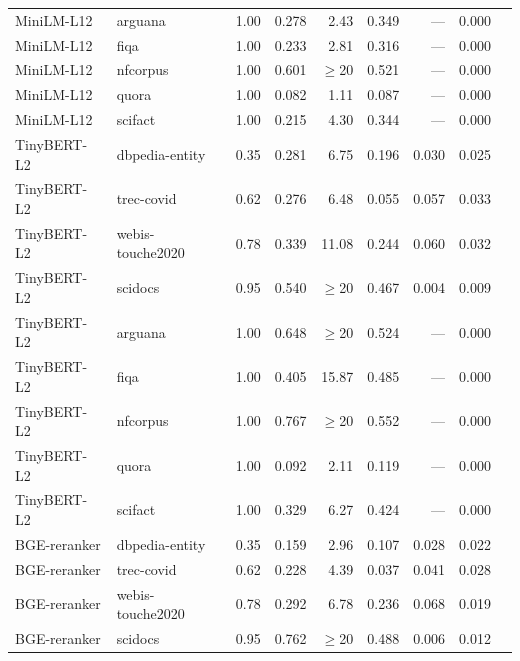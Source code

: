 \begin{table}[h!]
\begin{tabular}{llrrrrrrr}
MiniLM-L12     & arguana              & 1.00 & 0.278 & 2.43 & 0.349 & --- & 0.000 \\
\rowcolor{singleclasspink}
MiniLM-L12     & fiqa                 & 1.00 & 0.233 & 2.81 & 0.316 & --- & 0.000 \\
\rowcolor{singleclasspink}
MiniLM-L12     & nfcorpus             & 1.00 & 0.601 & $\geq$20 & 0.521 & --- & 0.000 \\
\rowcolor{singleclasspink}
MiniLM-L12     & quora                & 1.00 & 0.082 & 1.11 & 0.087 & --- & 0.000 \\
\rowcolor{singleclasspink}
MiniLM-L12     & scifact              & 1.00 & 0.215 & 4.30 & 0.344 & --- & 0.000 \\
\midrule
\rowcolor{cleangreen}
TinyBERT-L2    & dbpedia-entity       & 0.35 & 0.281 & 6.75 & 0.196 & 0.030 & 0.025 \\
\rowcolor{cleangreen}
TinyBERT-L2    & trec-covid           & 0.62 & 0.276 & 6.48 & 0.055 & 0.057 & 0.033 \\
\rowcolor{cleangreen}
TinyBERT-L2    & webis-touche2020     & 0.78 & 0.339 & 11.08 & 0.244 & 0.060 & 0.032 \\
\rowcolor{cleangreen}
TinyBERT-L2    & scidocs              & 0.95 & 0.540 & $\geq$20 & 0.467 & 0.004 & 0.009 \\
\rowcolor{singleclasspink}
TinyBERT-L2    & arguana              & 1.00 & 0.648 & $\geq$20 & 0.524 & --- & 0.000 \\
\rowcolor{singleclasspink}
TinyBERT-L2    & fiqa                 & 1.00 & 0.405 & 15.87 & 0.485 & --- & 0.000 \\
\rowcolor{singleclasspink}
TinyBERT-L2    & nfcorpus             & 1.00 & 0.767 & $\geq$20 & 0.552 & --- & 0.000 \\
\rowcolor{singleclasspink}
TinyBERT-L2    & quora                & 1.00 & 0.092 & 2.11 & 0.119 & --- & 0.000 \\
\rowcolor{singleclasspink}
TinyBERT-L2    & scifact              & 1.00 & 0.329 & 6.27 & 0.424 & --- & 0.000 \\
\midrule
\rowcolor{cleangreen}
BGE-reranker   & dbpedia-entity       & 0.35 & 0.159 & 2.96 & 0.107 & 0.028 & 0.022 \\
\rowcolor{cleangreen}
BGE-reranker   & trec-covid           & 0.62 & 0.228 & 4.39 & 0.037 & 0.041 & 0.028 \\
\rowcolor{cleangreen}
BGE-reranker   & webis-touche2020     & 0.78 & 0.292 & 6.78 & 0.236 & 0.068 & 0.019 \\
\rowcolor{cleangreen}
BGE-reranker   & scidocs              & 0.95 & 0.762 & $\geq$20 & 0.488 & 0.006 & 0.012 \\

\end{tabular}
\end{table}
